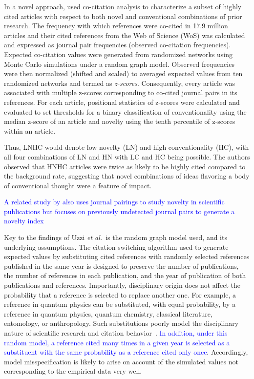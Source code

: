 \documentclass[NETN]{stjour}
\begin{document}
In a novel approach, \cite{uzzi_atypical_2013} used co-citation analysis to characterize a subset of highly cited articles with respect to both novel and conventional combinations of prior research. The frequency with which references were co-cited  in 17.9 million articles and their cited references from the Web of Science (WoS) was calculated and expressed as journal pair frequencies (observed co-citation frequencies). Expected co-citation values were generated from randomized networks using Monte Carlo simulations under a random graph model. Observed frequencies were then normalized (shifted and scaled) to averaged expected values from ten randomized networks and termed as \emph{z-scores}. Consequently, every article was associated with multiple z-scores corresponding to co-cited journal pairs in its references. For each article, positional statistics of z-scores were calculated and evaluated to set thresholds for a binary classification of conventionality using the median z-score of an article and novelty using the tenth percentile of z-scores within an article.

Thus, LNHC would denote low novelty (LN) and high conventionality (HC), with all four combinations of LN and HN with LC and HC being possible. The authors observed that HNHC articles were twice as likely to be highly cited compared to the background rate, suggesting that novel combinations of ideas flavoring a body of conventional thought were a feature of impact. 

\textcolor{blue}{A related study by \cite{wang_bias_2017} also uses journal pairings to study novelty in scientific publications but focuses on previously undetected journal pairs to generate a novelty index}

Key to the findings of Uzzi {\em et al.}~is the random graph model used, and its underlying assumptions. The citation switching algorithm used to generate expected values by substituting cited references with randomly selected references published in the same year is designed to preserve the number of publications, the number of references in each publication, and the year of publication of both publications and references. Importantly, disciplinary origin does not affect the probability that a reference is selected to replace another one. For example, a reference in quantum physics can be substituted, with equal probability, by a reference in quantum physics, quantum chemistry, classical literature, entomology, or anthropology. Such substitutions poorly model the disciplinary nature of scientific research and citation behavior~\citep{wallace_lariviere_gingras_2012,moed_measuring_2010,klavans_research_2017,garfield_1979}. \textcolor{blue}{In addition, under this random model, a reference cited many times in a given year is selected as a substituent with the same probability as a reference cited only once}. Accordingly, model misspecification is likely to arise on account of the simulated values not corresponding to the empirical data very well.
\end{document}
